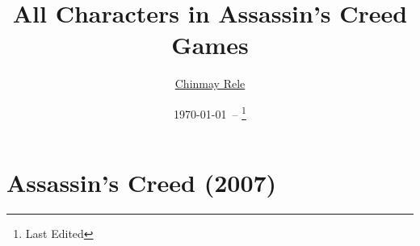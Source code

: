 \documentclass[12pt]{article}
\title{All Characters in Assassin's Creed Games}
\author{\href{mailto:rele.chinmay@gmail.com}{Chinmay Rele}}
\date{\today\ -- \currenttime \thanks{Last Edited}}
\begin{document}
\maketitle
\tableofcontents
\listoffigures
\listoftables
\thispagestyle{empty}


%
\section{Assassin's Creed (2007)}
	

\end{document}
